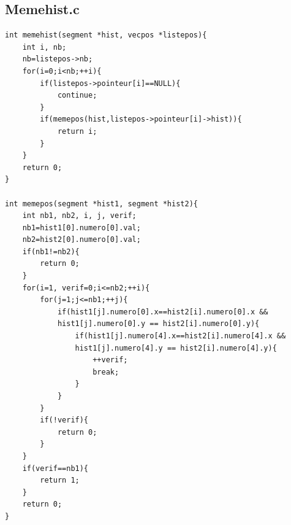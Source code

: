 \documentclass[11pt]{article}
\begin{document}
\subsection{Memehist.c}
\begin{verbatim}
int memehist(segment *hist, vecpos *listepos){
	int i, nb;
	nb=listepos->nb;
	for(i=0;i<nb;++i){
		if(listepos->pointeur[i]==NULL){
			continue;
		}
		if(memepos(hist,listepos->pointeur[i]->hist)){
			return i;
		}
	}
	return 0;
}

int memepos(segment *hist1, segment *hist2){
	int nb1, nb2, i, j, verif;
	nb1=hist1[0].numero[0].val;
	nb2=hist2[0].numero[0].val;
	if(nb1!=nb2){
		return 0;
	}
	for(i=1, verif=0;i<=nb2;++i){
		for(j=1;j<=nb1;++j){
			if(hist1[j].numero[0].x==hist2[i].numero[0].x &&
			hist1[j].numero[0].y == hist2[i].numero[0].y){
				if(hist1[j].numero[4].x==hist2[i].numero[4].x &&
				hist1[j].numero[4].y == hist2[i].numero[4].y){
					++verif;
					break;
				}
			}
		}
		if(!verif){
			return 0;
		}
	}
	if(verif==nb1){
		return 1;
	}
	return 0;
}
\end{verbatim}
\end{document}
